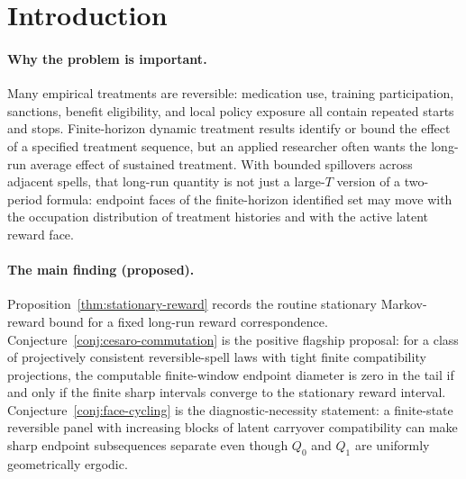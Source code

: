 \documentclass[11pt]{article}
\theoremstyle{definition}
\theoremstyle{plain}
\theoremstyle{remark}
\begin{document}
\begin{abstract}
Finite-horizon dynamic treatment formulas do not by themselves define a long-run estimand when treatment can turn on, turn off, and turn on again.  This proposal asks for a finite-window frontier deciding when sharp partial-identification intervals for reversible bounded-carryover treatments converge to a stationary or Cesaro-limit identified set.  The routine background component is a Markov-reward support formula for long-run bounds once a stationary reward correspondence and sustained-regime transition kernels are already fixed.  The positive flagship conjecture is an if-and-only-if criterion: on a nontrivial class of projectively consistent reversible-spell laws, vanishing finite-window endpoint diameter is exactly equivalent to convergence of the finite sharp intervals to the stationary long-run interval, with stationary liftability following from the class restrictions.  The negative flagship conjecture is a block-switching sharpness witness showing that finite-horizon sharp-bounds workflows cannot be summarized by a single stationary interval unless that frontier criterion is reported.
\end{abstract}

\section{Introduction}
\paragraph{Why the problem is important.}
Many empirical treatments are reversible: medication use, training participation, sanctions, benefit eligibility, and local policy exposure all contain repeated starts and stops.  Finite-horizon dynamic treatment results identify or bound the effect of a specified treatment sequence, but an applied researcher often wants the long-run average effect of sustained treatment.  With bounded spillovers across adjacent spells, that long-run quantity is not just a large-\(T\) version of a two-period formula: endpoint faces of the finite-horizon identified set may move with the occupation distribution of treatment histories and with the active latent reward face.

\paragraph{The main finding (proposed).}
Proposition~\ref{thm:stationary-reward} records the routine stationary Markov-reward bound for a fixed long-run reward correspondence.  Conjecture~\ref{conj:cesaro-commutation} is the positive flagship proposal: for a class of projectively consistent reversible-spell laws with tight finite compatibility projections, the computable finite-window endpoint diameter is zero in the tail if and only if the finite sharp intervals converge to the stationary reward interval.  Conjecture~\ref{conj:face-cycling} is the diagnostic-necessity statement: a finite-state reversible panel with increasing blocks of latent carryover compatibility can make sharp endpoint subsequences separate even though \(Q_0\) and \(Q_1\) are uniformly geometrically ergodic.
\end{document}
